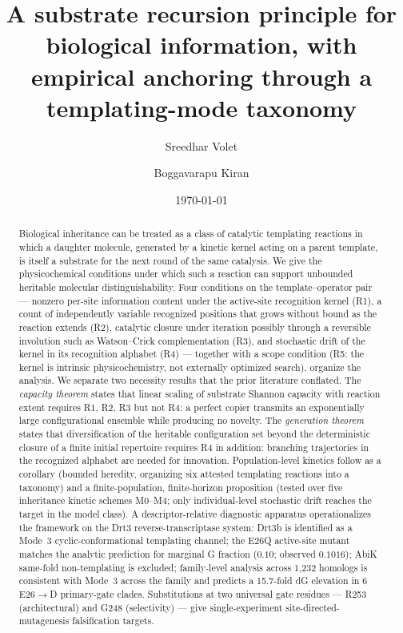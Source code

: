 \documentclass[aps,prx,reprint,amsmath,amssymb,floatfix,superscriptaddress,nofootinbib]{revtex4-2}
\theoremstyle{plain-thm}
\theoremstyle{definition-thm}
\begin{document}
\title{A substrate recursion principle for biological information, with empirical anchoring through a templating-mode taxonomy}

\author{Sreedhar Volet}

\author{Boggavarapu Kiran}

\date{\today}

\begin{abstract}
Biological inheritance can be treated as a class of catalytic templating reactions in which a daughter molecule, generated by a kinetic kernel acting on a parent template, is itself a substrate for the next round of the same catalysis. We give the physicochemical conditions under which such a reaction can support unbounded heritable molecular distinguishability. Four conditions on the template--operator pair --- nonzero per-site information content under the active-site recognition kernel (R1), a count of independently variable recognized positions that grows without bound as the reaction extends (R2), catalytic closure under iteration possibly through a reversible involution such as Watson--Crick complementation (R3), and stochastic drift of the kernel in its recognition alphabet (R4) --- together with a scope condition (R5: the kernel is intrinsic physicochemistry, not externally optimized search), organize the analysis. We separate two necessity results that the prior literature conflated. The \emph{capacity theorem} states that linear scaling of substrate Shannon capacity with reaction extent requires R1, R2, R3 but not R4: a perfect copier transmits an exponentially large configurational ensemble while producing no novelty. The \emph{generation theorem} states that diversification of the heritable configuration set beyond the deterministic closure of a finite initial repertoire requires R4 in addition: branching trajectories in the recognized alphabet are needed for innovation. Population-level kinetics follow as a corollary (bounded heredity, organizing six attested templating reactions into a taxonomy) and a finite-population, finite-horizon proposition (tested over five inheritance kinetic schemes M0--M4; only individual-level stochastic drift reaches the target in the model class). A descriptor-relative diagnostic apparatus operationalizes the framework on the Drt3 reverse-transcriptase system: Drt3b is identified as a Mode~3 cyclic-conformational templating channel; the E26Q active-site mutant matches the analytic prediction for marginal G fraction ($0.10$; observed $0.1016$); AbiK same-fold non-templating is excluded; family-level analysis across 1{,}232 homologs is consistent with Mode~3 across the family and predicts a 15.7-fold dG elevation in 6 E26$\to$D primary-gate clades. Substitutions at two universal gate residues --- R253 (architectural) and G248 (selectivity) --- give single-experiment site-directed-mutagenesis falsification targets.
\end{abstract}
\end{document}
